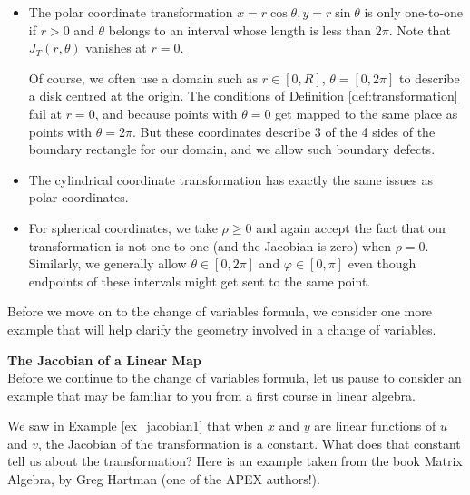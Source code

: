 \begin{itemize}
\item The polar coordinate transformation $x=r\cos\theta, y=r\sin\theta$ is only one-to-one if $r>0$ and $\theta$ belongs to an interval whose length is less than $2\pi$. Note that $J_T(r,\theta)$ vanishes at $r=0$.

Of course, we often use a domain such as $r\in [0,R]$, $\theta = [0,2\pi]$ to describe a disk centred at the origin. The conditions of Definition \ref{def:transformation} fail at $r=0$, and because points with $\theta=0$ get mapped to the same place as points with $\theta = 2\pi$. But these coordinates describe 3 of the 4 sides of the boundary rectangle for our domain, and we allow such boundary defects.

\item The cylindrical coordinate transformation has exactly the same issues as polar coordinates.

\item For spherical coordinates, we take $\rho\geq 0$ and again accept the fact that our transformation is not one-to-one (and the Jacobian is zero) when $\rho=0$. Similarly, we generally allow $\theta\in [0,2\pi]$ and $\varphi\in [0,\pi]$ even though endpoints of these intervals might get sent to the same point.
\end{itemize}


Before we move on to the change of variables formula, we consider one more example that will help clarify the geometry involved in a change of variables.

\noindent\textbf{\large The Jacobian of a Linear Map}\\

Before we continue to the change of variables formula, let us pause to consider an example that may be familiar to you from a first course in linear algebra.

We saw in Example \ref{ex_jacobian1} that when $x$ and $y$ are linear functions of $u$ and $v$, the Jacobian of the transformation is a constant. What does that constant tell us about the transformation? Here is an example taken from the book Matrix Algebra, by Greg Hartman (one of the APEX authors!).

\bigskip

